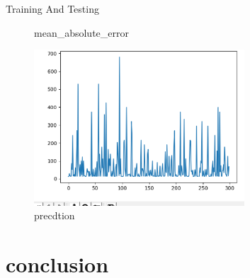 \documentclass[
 size=14pt,
 paper=smartboard,  %
 mode=present, 		%
 display=slides, 	%
 style=tuliplab,  	%
 pauseslide,
 fleqn,leqno]{powerdot}
\begin{document}
\begin{slide}{Training And Testing}
\begin{figure}[htbp]
\begin{minipage}[t]{0.38\textwidth}
    \vspace{-1.4em}
    \caption{mean_absolute_error}
  \end{minipage}
  \begin{minipage}[t]{0.38\textwidth}
    \centering
    \includegraphics[width=0.7\textwidth]{logos/1 (3).eps}
    \vspace{-1.4em}
    \caption{precdtion}
  \end{minipage}
  
\end{figure}
\end{slide}







\section{conclusion}
\end{document}
